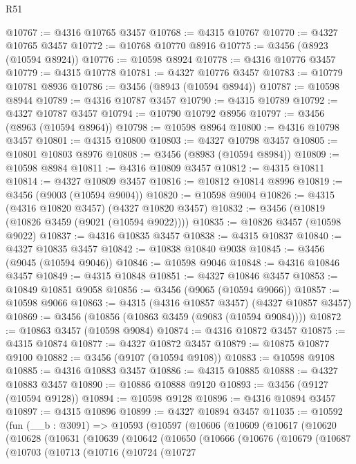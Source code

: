 \begin{lexlean}{R51}
\begin{coremodule}
@10767 := @4316 @10765 @3457
@10768 := @4315 @10767
@10770 := @4327 @10765 @3457
@10772 := @10768 @10770 @8916
@10775 := @3456 (@8923 (@10594 @8924))
@10776 := @10598 @8924
@10778 := @4316 @10776 @3457
@10779 := @4315 @10778
@10781 := @4327 @10776 @3457
@10783 := @10779 @10781 @8936
@10786 := @3456 (@8943 (@10594 @8944))
@10787 := @10598 @8944
@10789 := @4316 @10787 @3457
@10790 := @4315 @10789
@10792 := @4327 @10787 @3457
@10794 := @10790 @10792 @8956
@10797 := @3456 (@8963 (@10594 @8964))
@10798 := @10598 @8964
@10800 := @4316 @10798 @3457
@10801 := @4315 @10800
@10803 := @4327 @10798 @3457
@10805 := @10801 @10803 @8976
@10808 := @3456 (@8983 (@10594 @8984))
@10809 := @10598 @8984
@10811 := @4316 @10809 @3457
@10812 := @4315 @10811
@10814 := @4327 @10809 @3457
@10816 := @10812 @10814 @8996
@10819 := @3456 (@9003 (@10594 @9004))
@10820 := @10598 @9004
@10826 := @4315 (@4316 @10820 @3457) (@4327 @10820 @3457)
@10832 := @3456 (@10819 (@10826 @3459 (@9021 (@10594 @9022))))
@10835 := @10826 @3457 (@10598 @9022)
@10837 := @4316 @10835 @3457
@10838 := @4315 @10837
@10840 := @4327 @10835 @3457
@10842 := @10838 @10840 @9038
@10845 := @3456 (@9045 (@10594 @9046))
@10846 := @10598 @9046
@10848 := @4316 @10846 @3457
@10849 := @4315 @10848
@10851 := @4327 @10846 @3457
@10853 := @10849 @10851 @9058
@10856 := @3456 (@9065 (@10594 @9066))
@10857 := @10598 @9066
@10863 := @4315 (@4316 @10857 @3457) (@4327 @10857 @3457)
@10869 := @3456 (@10856 (@10863 @3459 (@9083 (@10594 @9084))))
@10872 := @10863 @3457 (@10598 @9084)
@10874 := @4316 @10872 @3457
@10875 := @4315 @10874
@10877 := @4327 @10872 @3457
@10879 := @10875 @10877 @9100
@10882 := @3456 (@9107 (@10594 @9108))
@10883 := @10598 @9108
@10885 := @4316 @10883 @3457
@10886 := @4315 @10885
@10888 := @4327 @10883 @3457
@10890 := @10886 @10888 @9120
@10893 := @3456 (@9127 (@10594 @9128))
@10894 := @10598 @9128
@10896 := @4316 @10894 @3457
@10897 := @4315 @10896
@10899 := @4327 @10894 @3457
@11035 := @10592
    (fun (__b : @3091) =>
    @10593
      (@10597
        (@10606
          (@10609
            (@10617
              (@10620
                (@10628
                  (@10631
                    (@10639
                      (@10642
                        (@10650
                          (@10666
                            (@10676
                              (@10679
                                (@10687
                                  (@10703
                                    (@10713
                                      (@10716
                                        (@10724
                                          (@10727

\end{coremodule}
\end{lexlean}
